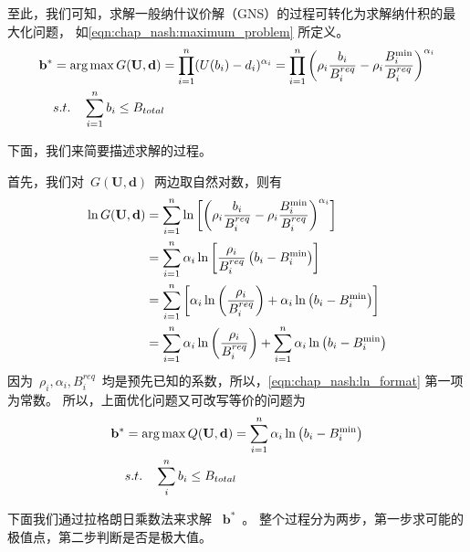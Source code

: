 至此，我们可知，求解一般纳什议价解（GNS）的过程可转化为求解纳什积的最大化问题，
如\eqref{eqn:chap_nash:maximum_problem} 所定义。
\begin{align}
    \mathbf{b}^* &= \arg \max G(\mathbf{U}, \mathbf{d}) = \prod_{i=1}^n (U(b_i) - d_i)^{\alpha_i} = \prod_{i=1}^{n} \left(\rho_i \frac{b_i}{B_i^{req}} - \rho_i \frac{B_i^{\min}}{B_i^{req}} \right)^{\alpha_i} \notag\\
    & s.t. \quad \sum_{i=1}^n b_i \le B_{total} 
    \label{eqn:chap_nash:maximum_problem}
\end{align}

%
下面，我们来简要描述求解的过程。

首先，我们对~$G(\mathbf{U}, \mathbf{d})$~两边取自然对数，则有
\begin{align}
    \ln G(\mathbf{U}, \mathbf{d}) &= \sum_{i=1}^{n} \ln \left[ \left(\rho_i \frac{b_i}{B_i^{req}} - \rho_i \frac{B_i^{\min}}{B_i^{req}} \right)^{\alpha_i} \right] \notag \notag\\
    &= \sum_{i=1}^{n} \alpha_i\ln \left[ \frac{\rho_i}{B_i^{req}} \left( b_i - B_i^{\min} \right) \right] \notag \\
    &= \sum_{i=1}^n \left[ \alpha_i \ln \left( \frac{\rho_i}{B_i^{req}} \right) + \alpha_i \ln \left( b_i - B_i^{\min} \right) \right] \notag\\
    &= \sum_{i=1}^n \alpha_i \ln \left( \frac{\rho_i}{B_i^{req}} \right) + \sum_{i=1}^n  \alpha_i \ln \left(b_i - B_i^{\min} \right) 
    \label{eqn:chap_nash:ln_format}
\end{align}
因为~$\rho_i, \alpha_i, B_i^{req}$~均是预先已知的系数，所以，\eqref{eqn:chap_nash:ln_format} 第一项为常数。
所以，上面优化问题又可改写等价的问题为
\begin{align}
    \mathbf{b}^* &= \arg \max Q(\mathbf{U}, \mathbf{d}) = \sum_{i=1}^n  \alpha_i \ln \left( b_i - B_i^{\min} \right) \notag\\
    & s.t. \quad \sum_i^n b_i \le B_{total} 
\end{align}

下面我们通过拉格朗日乘数法来求解 ~$\mathbf{b}^*$~。
整个过程分为两步，第一步求可能的极值点，第二步判断是否是极大值。

